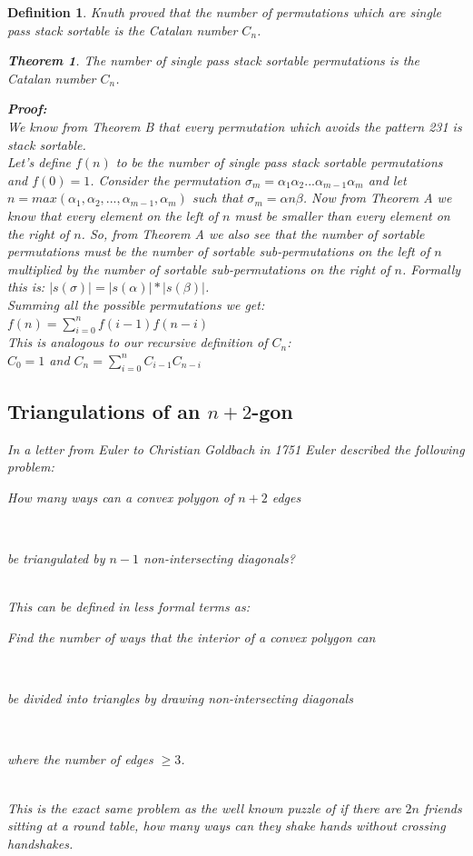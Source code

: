 \documentclass[12pt]{article}
\newtheorem{definition}{Definition}
\newtheorem{theorem}{Theorem}
\begin{document}
\begin{definition}
Knuth proved that the number of permutations which are single pass stack sortable is the Catalan number $C_{n}$.\cite{StackLim}\\
\begin{theorem}
The number of single pass stack sortable permutations is the Catalan number $C_{n}$.
\end{theorem}
{\bf Proof:}\\
We know from Theorem B that every permutation which avoids the pattern 231 is stack sortable.\\
Let's define $f(n)$ to be the number of single pass stack sortable permutations and $f(0) = 1$. Consider the permutation $\sigma_{m} = \alpha_{1}\alpha_{2}...\alpha_{m-1}\alpha_{m}$ and let $n = max(\alpha_{1}, \alpha_{2}, ..., \alpha_{m-1}, \alpha_{m})$ such that $\sigma_{m} = \alpha n \beta$. Now from Theorem A we know that every element on the left of $n$ must be smaller than every element on the right of $n$. So, from Theorem A we also see that the number of sortable permutations must be the number of sortable sub-permutations on the left of $n$ multiplied by the number of sortable sub-permutations on the right of $n$. Formally this is: $|s(\sigma)| = |s(\alpha)| * |s(\beta)|$.\\
Summing all the possible permutations we get:\\
$f(n) = \sum_{i=0}^{n}f(i-1) f(n-i)$\\
This is analogous to our recursive definition of $C_{n}$:\\
$C_{0} = 1$ and $C_{n} = \sum_{i=0}^{n}C_{i-1} C_{n-i}$\\
\square


\subsection{Triangulations of an $n+2$-gon}
\label{sec:n+2gonTriangulation}
In a letter from Euler to Christian Goldbach in 1751 Euler described the following problem:\\
\centerline{How many ways can a convex polygon of $n + 2$ edges}\\
\centerline{be triangulated by $n - 1$ non-intersecting diagonals?}\\
This can be defined in less formal terms as:\\
\centerline{Find the number of ways that the interior of a convex polygon can}\\
\centerline{be divided into triangles by drawing non-intersecting diagonals}\\
\centerline{where the number of edges $\geq 3$.}\\
This is the exact same problem as the well known puzzle of if there are $2n$ friends sitting at a round table, how many ways can they shake hands without crossing handshakes.


\end{definition}
\end{document}
